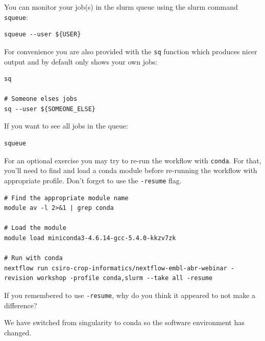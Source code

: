 \begin{note}
You can monitor your job(s) in the slurm queue using the slurm command \texttt{squeue}:

\begin{lstlisting}
squeue --user ${USER}
\end{lstlisting}

For convenience you are also provided with the \texttt{sq} function which produces nicer output and by default only shows your own jobs:

\begin{lstlisting}
sq

# Someone elses jobs
sq --user ${SOMEONE_ELSE}
\end{lstlisting}

If you want to see all jobs in the queue:

\begin{lstlisting}
squeue
\end{lstlisting}

\end{note}

\begin{bonus}
For an optional exercise you may try to re-run the workflow with \texttt{conda}.
For that, you'll need to find and load a conda module before re-running the workflow with appropriate profile. Don't forget to use the \texttt{-resume} flag.
\begin{answer}
\begin{lstlisting}
# Find the appropriate module name
module av -l 2>&1 | grep conda

# Load the module
module load miniconda3-4.6.14-gcc-5.4.0-kkzv7zk

# Run with conda
nextflow run csiro-crop-informatics/nextflow-embl-abr-webinar -revision workshop -profile conda,slurm --take all -resume

\end{lstlisting}
\end{answer}

If you remembered to use \texttt{-resume}, why do you think it appeared to not make a difference?

\begin{answer}
We have switched from singularity to conda so the software environment has changed. 
\end{answer}


\end{bonus}


